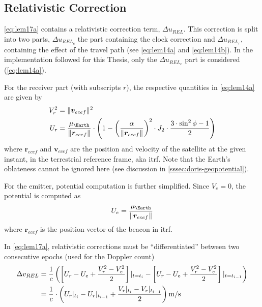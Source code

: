 \subsection{Relativistic Correction}\label{ssec:relativistic-correction}
\autoref{eq:lem17a} contains a relativistic correction term, $\Delta u_{REL}$. This 
correction is split into two parts, $\Delta u_{REL_c}$ the part containing the 
clock correction and $\Delta u_{REL_r}$, containing the effect of the travel 
path (see \autoref{eq:lem14a} and \autoref{eq:lem14b}). In the implementation followed for this Thesis, 
only the $\Delta u_{REL_c}$ part is considered (\autoref{eq:lem14a}).

For the receiver part (with subscripts $r$), the respective quantities in 
\autoref{eq:lem14a} are given by
\begin{equation}
  \begin{aligned}
    V^2_r &= \norm{\bm{v}_{ecef}}^2 \\
    U_r   &= \frac{\mu _{\Earth}}{\norm{\bm{r}_{ecef}}} \cdot \left( 1 - 
      \left(\frac{\alpha}{\norm{\bm{r}_{ecef}}}\right) ^2 \cdot J_2 \cdot
        \frac{3 \cdot \sin ^2{\phi} -1}{2} \right)
  \end{aligned}
  \label{eq:potential-receiver}
\end{equation}
where $\bm{r}_{ecef}$ and $\bm{v}_{ecef}$ are the position and velocity of the 
satellite at the given instant, in the terrestrial reference frame, 
aka \gls{itrf}. Note that the Earth's oblateness cannot be ignored here (see 
discussion in \autoref{sssec:doris-geopotential}).

For the emitter, potential computation is further simplified. Since $V_e = 0$, 
the potential is computed as 
\begin{equation}
  U_e = \frac{\mu _{\Earth}}{\norm{\bm{r}_{ecef}}}
  \label{eq:potential-emitter}
\end{equation}
where $\bm{r}_{ecef}$ is the position vector of the beacon in \gls{itrf}.

In \autoref{eq:lem17a}, relativistic corrections must be ``differentiated'' between 
two consecutive epochs (used for the Doppler count)
\begin{equation}\label{eq:drel-diff}
  \begin{aligned}
    \Delta v_{REL} &= \frac{1}{c} 
      \left( 
        \left[ U_r - U_e + \frac{V^2_r - V^2_e}{2} \right]\at{t=t_i} 
        - \left[ U_r - U_e + \frac{V^2_r - V^2_e}{2} \right]\at{t=t_{i-1}} 
      \right) \\
      &= \frac{1}{c} \cdot \left( 
        U_r\at{t_i} - U_r\at{t_{i-1}} +  \frac{V_r\at{t_i}-V_r\at{t_{i-1}}}{2} 
        \right) \si{\m\per\s}
  \end{aligned}
\end{equation}

